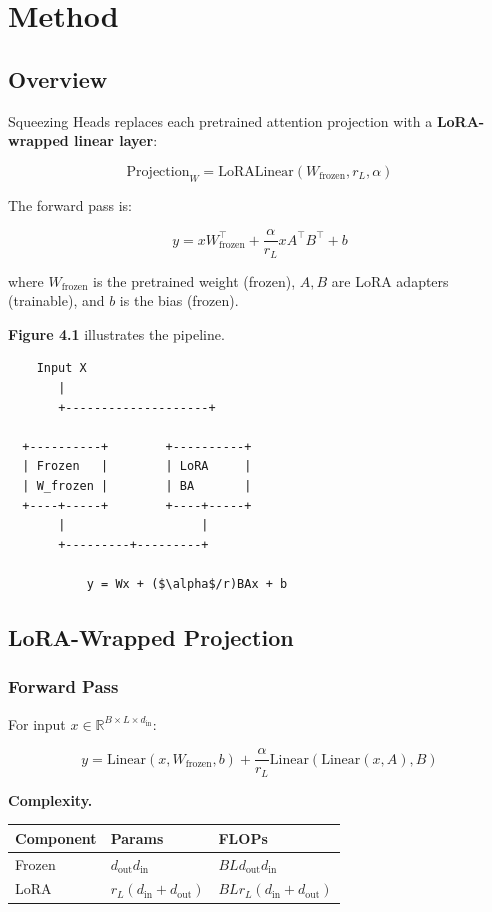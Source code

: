 
\section{Method}

\subsection{Overview}

Squeezing Heads replaces each pretrained attention projection with a 
\textbf{LoRA-wrapped linear layer}:

\[
\text{Projection}_{W} = \text{LoRALinear}(W_\text{frozen}, r_L, \alpha)
\]

The forward pass is:

\[
y = x W_\text{frozen}^\top + \frac{\alpha}{r_L} x A^\top B^\top + b
\]

where $W_\text{frozen}$ is the pretrained weight (frozen), $A, B$ are LoRA 
adapters (trainable), and $b$ is the bias (frozen).

\textbf{Figure 4.1} illustrates the pipeline.

\begin{lstlisting}
    Input X
       |
       +--------------------+
                             
  +----------+        +----------+
  | Frozen   |        | LoRA     |
  | W_frozen |        | BA       |
  +----+-----+        +----+-----+
       |                   |
       +---------+---------+
                  
           y = Wx + ($\alpha$/r)BAx + b
\end{lstlisting}

\subsection{LoRA-Wrapped Projection}

\subsubsection{Forward Pass}

For input $x \in \mathbb{R}^{B \times L \times d_\text{in}}$:

\[
y = \text{Linear}(x, W_\text{frozen}, b) + \frac{\alpha}{r_L} \text{Linear}(\text{Linear}(x, A), B)
\]

\textbf{Complexity.}

\begin{table}[H]
\centering
\small
\begin{tabular}{lll}
\toprule
\textbf{Component} & \textbf{Params} & \textbf{FLOPs} \\
\midrule
Frozen & $d_\text{out} d_\text{in}$ & $B L d_\text{out} d_\text{in}$ \\
LoRA & $r_L (d_\text{in} + d_\text{out})$ & $B L r_L (d_\text{in} + d_\text{out})$ \\
\bottomrule
\end{tabular}
\end{table}

